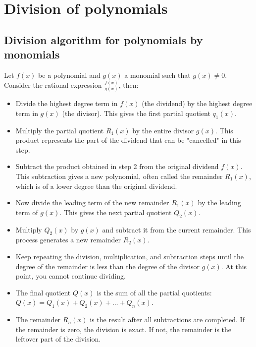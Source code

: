\documentclass{article}
\begin{document}
\section{Division of polynomials}
\subsection{Division algorithm for polynomials by monomials}
Let $f(x)$ be a polynomial and $g(x)$ a monomial such that $g(x) \neq 0$. Consider the rational expression $\frac{f(x)}{g(x)}$, then:

\begin{center}
\end{center}

\begin{itemize}
    \item Divide the highest degree term in $f(x)$ (the dividend) by the highest degree term in $g(x)$ (the divisor). This gives the first partial quotient $q_1(x)$.
    \item Multiply the partial quotient $R_1(x)$ by the entire divisor $g(x)$. This product represents the part of the dividend that can be "cancelled" in this step.
    \item Subtract the product obtained in step 2 from the original dividend $f(x)$. This subtraction gives a new polynomial, often called the remainder $R_1(x)$, which is of a lower degree than the original dividend.
    \item Now divide the leading term of the new remainder $R_1(x)$ by the leading term of $g(x)$. This gives the next partial quotient $Q_2(x)$.
    \item Multiply $Q_2(x)$ by $g(x)$ and subtract it from the current remainder. This process generates a new remainder $R_2(x)$.
    \item Keep repeating the division, multiplication, and subtraction steps until the degree of the remainder is less than the degree of the divisor $g(x)$. At this point, you cannot continue dividing.
    \item The final quotient $Q(x)$ is the sum of all the partial quotients: $Q(x) = Q_1(x) + Q_2(x) + \dots + Q_n(x)$.
    \item The remainder $R_n(x)$ is the result after all subtractions are completed. If the remainder is zero, the division is exact. If not, the remainder is the leftover part of the division.
\end{itemize}\
\end{document}
